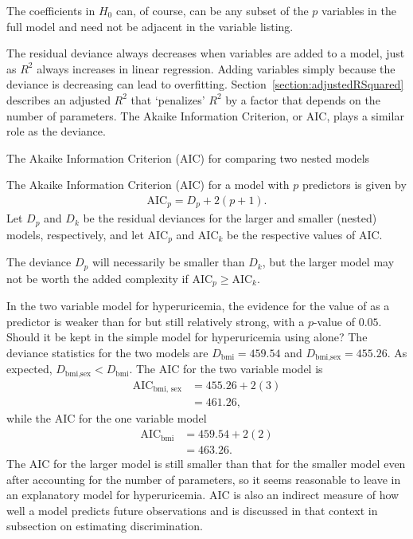 The coefficients in $H_0$ can, of course, can be any subset of the $p$ variables in the full model and need not be adjacent in the variable listing.

The residual deviance always decreases when variables are added to a model, just as $R^2$ always increases in linear regression. Adding variables simply because the deviance is decreasing can lead to overfitting. Section~\ref{section:adjustedRSquared} describes an adjusted $R^2$ that `penalizes' $R^2$ by a factor that depends on the number of parameters.  The Akaike Information Criterion, or AIC, plays a similar role as the deviance.

\begin{onebox}{The Akaike Information Criterion (AIC) for comparing two nested models}

The Akaike Information Criterion (AIC) for a model with $p$ predictors is given by 
\begin{align*}
  \text{AIC}_p = D_p + 2(p + 1).
\end{align*}
Let $D_p$ and $D_k$ be the residual deviances for the larger and smaller (nested) models, respectively, and let $\text{AIC}_p$ and $\text{AIC}_k$ be the respective values of AIC.

The deviance $D_p$ will necessarily be smaller than $D_k$, but the larger model may not be worth the added complexity if $\text{AIC}_p \geq \text{AIC}_k$.

\end{onebox}

In the two variable model for hyperuricemia, the evidence for the value of  as a predictor is weaker than for  but still relatively strong, with a $p$-value of $0.05$.  Should it be kept in the simple model for hyperuricemia using  alone? The deviance statistics for the two models  are $D_{\text{bmi}} = 459.54$ and $D_{\text{bmi,sex}} = 455.26$.
As expected, $D_{\text{bmi,sex}} < D_{\text{bmi}}$.  The AIC for the two variable model is 
\begin{align}
\text{AIC}_{\text{bmi, sex}} &= 455.26 + 2(3) \\
             &= 461.26,
             \label{eqn:AICBMISex}
\end{align}
while the AIC for the one variable model
\begin{align}
\text{AIC}_{\text{bmi}} &= 459.54 + 2(2)  \\
             &= 463.26.
             \label{eqn:AICBMI}
\end{align}
The AIC for the larger model is still smaller than that for the smaller model even after accounting for  the number of parameters, so it seems reasonable to leave  in an explanatory model for hyperuricemia.  AIC is also an indirect measure of how well a model predicts future observations and is discussed in that context in subsection on estimating discrimination.

